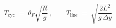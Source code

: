 \documentclass[preview,border=2pt]{standalone}
\begin{document}
$T_{\mathrm{cyc}} \;=\; \theta_{F}\sqrt{\dfrac{R}{g}}\,,\qquad
T_{\mathrm{line}} \;=\; \sqrt{\dfrac{2L^{2}}{g\,\Delta y}}$
\end{document}
